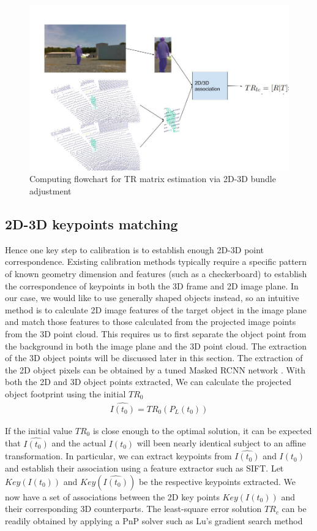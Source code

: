 \documentclass{article}
\begin{document}
\begin{figure}[]
    \centering
    \includegraphics[width=\columnwidth]{images/computing_flowchat.jpg}
    \caption{Computing flowchart for TR matrix estimation via 2D-3D bundle adjustment}
    \label{fig:framework}
\end{figure}  

\subsection{2D-3D keypoints matching}
Hence one key step to calibration is to establish enough 2D-3D point correspondence. 
Existing calibration methods typically require a specific pattern of known geometry dimension and features (such as a checkerboard) to establish the correspondence of keypoints in both the 3D frame and 2D image plane. In our case, we would like to use generally shaped objects instead, so an intuitive method is to calculate 2D image features of the target object in the image plane and match those features to those calculated from the projected image points from the 3D point cloud. This requires us to first separate the object point from the background in both the image plane and the 3D point cloud. The extraction of the 3D object points will be discussed later in this section. The extraction of the 2D object pixels can be obtained by a tuned Masked RCNN network \cite{wang2019ldls}. With both the 2D and 3D object points extracted, We can calculate the projected object footprint using the initial $TR_0$ 
\begin{eqnarray}
    \hat {I(t_0)} = TR_0 (P_L(t_0))
\end{eqnarray}

If the initial value $TR_0$ is close enough to the optimal solution, it can be expected that 
$\hat{I(t_0)}$ and the actual $I(t_0)$ will been nearly identical subject to an affine transformation. In particular, we can extract keypoints from $\hat{I(t_0)}$ and $I(t_0)$ and establish their association using a feature extractor such as SIFT. Let $Key(I(t_0)) $ and $Key(\hat{I(t_0)}) $ be the respective keypoints extracted. We now have a set of associations between the 2D key points $Key(I(t_0)) $ and their corresponding 3D counterparts. The least-square error solution $TR_{c} $ can be readily obtained by applying a PnP solver such as Lu's gradient search method \cite{lu98}
 
\end{document}
